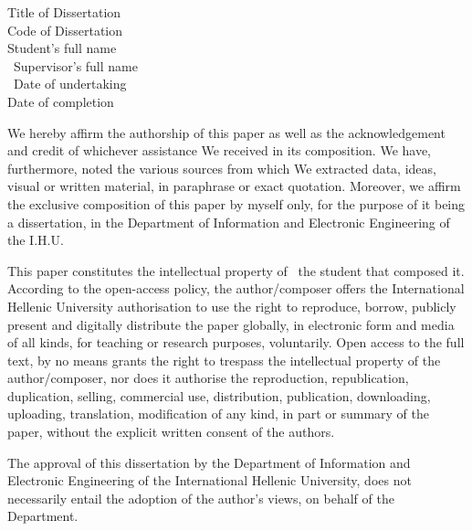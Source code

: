 \thispagestyle{empty} %

\vspace{3cm}

\begin{center}
Title of Dissertation \thesisTitle\\
Code of Dissertation \thesisID\\
Student’s full name \studentName\\\
Supervisor’s full name \supervisorName\\\
Date of undertaking \undertakingDate\\
Date of completion \completionDate\\
\end{center}

We hereby affirm the authorship of this paper as well as the acknowledgement and credit of whichever assistance We received in its composition. We have, furthermore, noted the various sources from which We extracted data, ideas, visual or written material, in paraphrase or exact quotation. Moreover, we affirm the exclusive composition of this paper by myself only, for the purpose of it being a dissertation, in the Department of Information and Electronic Engineering of the I.H.U.

This paper constitutes the intellectual property of \studentName\, the student that composed it. According to the open-access policy, the author/composer offers the International Hellenic University authorisation to use the right to reproduce, borrow, publicly present and digitally distribute the paper globally, in electronic form and media of all kinds, for teaching or research purposes, voluntarily. Open access to the full text, by no means grants the right to trespass the intellectual property of the author/composer, nor does it authorise the reproduction, republication, duplication, selling, commercial use, distribution, publication, downloading, uploading, translation, modification of any kind, in part or summary of the paper, without the explicit written consent of the authors.

The approval of this dissertation by the Department of Information and Electronic Engineering of the International Hellenic University, does not necessarily entail the adoption of the author’s views, on behalf of the Department.